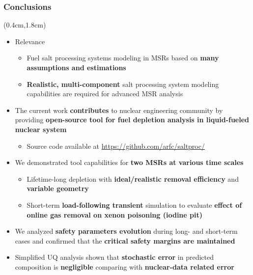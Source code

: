 \begin{frame}
\frametitle{Conclusions}
\begin{textblock*}{12cm}(0.4cm,1.8cm) %
	\begin{itemize}
		\itemsep1em
		\item Relevance
		\begin{itemize}
			\itemsep0.5em
			\item Fuel salt processing systems modeling in \glspl{MSR} based 
			on \textbf{many assumptions and estimations}
			\item \textbf{Realistic, multi-component} salt 
			processing system modeling capabilities are required for advanced 
			\gls{MSR} analysis
		\end{itemize} 
		\item The current work \textbf{contributes} to nuclear engineering 
		community by providing \textbf{open-source tool for fuel depletion 
		analysis in liquid-fueled nuclear system}
			\begin{itemize}
			\itemsep0.5em
			\item Source code available at 
			\url{https://github.com/arfc/saltproc/}
			\end{itemize}
		\item We demonstrated tool capabilities for \textbf{two MSRs at 
		various time scales}
		\begin{itemize}
			\itemsep0.5em
			\item Lifetime-long depletion with \textbf{ideal/realistic removal 
			efficiency} and \textbf{variable geometry}
			\item Short-term \textbf{load-following transient} simulation to 
			evaluate \textbf{effect of online gas removal on xenon poisoning 
			(iodine pit)}
		\end{itemize}
		\item We analyzed \textbf{safety parameters evolution} during long- 
		and short-term cases and confirmed that the \textbf{critical safety 
		margins are maintained}
		\item Simplified UQ analysis shown that \textbf{stochastic error} in 
		predicted composition is \textbf{negligible} comparing with 
		\textbf{nuclear-data related error}
	\end{itemize}
\end{textblock*}
\end{frame}

